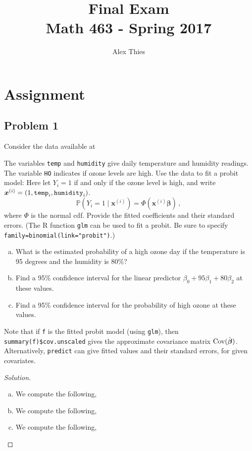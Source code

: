 \documentclass{amsart}
\author{Alex Thies}
\title{Final Exam \\ Math 463 - Spring 2017}
\DeclareMathOperator{\cov}{\rm Cov}
\newcommand{\bvec}[1]{{\boldsymbol #1}}
\begin{document}
	\maketitle

	\section{Assignment} %
	\label{sec:assignment}
		\subsection{Problem 1} %
		\label{sub:problem_1}
		Consider the data available at


		
		The variables \verb|temp| and \verb|humidity| give daily temperature and humidity readings.  
		The variable \verb|HO| indicates if ozone levels are high.
		Use the data to fit a probit model:
		Here let $Y_i = 1$ if and only if the ozone level is high, and write $\bvec{x}^{(i)} = (1, {\tt temp}_i, {\tt humidity}_i)$.
		\[
			\mathbb{P}(Y_i = 1 \mid \bvec{x}^{(i)}) = \Phi( \bvec{x}^{(i)} \bvec{\beta}) \,,
		  \]
		where $\Phi$ is the normal cdf.
		Provide the fitted coefficients and their standard errors. (The R function \verb|glm| can be used to fit a probit. 
		Be sure to specify \verb|family=binomial(link="probit")|.)  
		\begin{enumerate}[(a)]
		\item What is the estimated probability of a high ozone day if the temperature is 95 degrees and the humidity is 80\%? 
		\item Find a 95\% confidence interval for the linear predictor $\beta_0 + 95\beta_1 + 80\beta_2$ at these values.
		\item Find a 95\% confidence interval for the probability  of high ozone at these values.
		\end{enumerate}
		Note that if \verb|f| is the fitted probit model (using \verb|glm|), then \verb|summary(f)$cov.unscaled| gives the approximate covariance matrix $\cov(\hat{\bvec{\beta}})$.
		Alternatively, \verb|predict| can give fitted values and their standard errors, for given covariates.
		\begin{proof}[Solution] \
			\begin{enumerate}[(a)]
				\item We compute the following,
				\item We compute the following,
				\item We compute the following,
			\end{enumerate}
		\end{proof}
\end{document}
